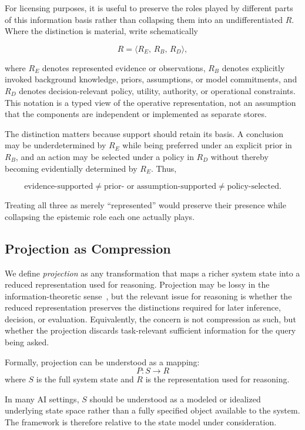 \documentclass[11pt]{article}
\begin{document}
For licensing purposes, it is useful to preserve the roles played by different parts of this information basis rather than collapsing them into an undifferentiated \(R\). Where the distinction is material, write schematically

\[
R
=
\langle
R_E,\,
R_B,\,
R_D
\rangle,
\]

where \(R_E\) denotes represented evidence or observations, \(R_B\) denotes explicitly invoked background knowledge, priors, assumptions, or model commitments, and \(R_D\) denotes decision-relevant policy, utility, authority, or operational constraints. This notation is a typed view of the operative representation, not an assumption that the components are independent or implemented as separate stores.

The distinction matters because support should retain its basis. A conclusion may be underdetermined by \(R_E\) while being preferred under an explicit prior in \(R_B\), and an action may be selected under a policy in \(R_D\) without thereby becoming evidentially determined by \(R_E\). Thus,

\[
\boxed{
\text{evidence-supported}
\neq
\text{prior- or assumption-supported}
\neq
\text{policy-selected}.
}
\]

Treating all three as merely ``represented'' would preserve their presence while collapsing the epistemic role each one actually plays.

\subsection{Projection as Compression}

We define \emph{projection} as any transformation that maps a richer system state into a reduced representation used for reasoning. Projection may be lossy in the information-theoretic sense~\cite{Shannon1948}, but the relevant issue for reasoning is whether the reduced representation preserves the distinctions required for later inference, decision, or evaluation. Equivalently, the concern is not compression as such, but whether the projection discards task-relevant sufficient information for the query being asked.

Formally, projection can be understood as a mapping:
\[
P: S \rightarrow R
\]
where $S$ is the full system state and $R$ is the representation used for reasoning.

In many AI settings, \(S\) should be understood as a modeled or idealized underlying state space rather than a fully specified object available to the system. The framework is therefore relative to the state model under consideration.
\end{document}
